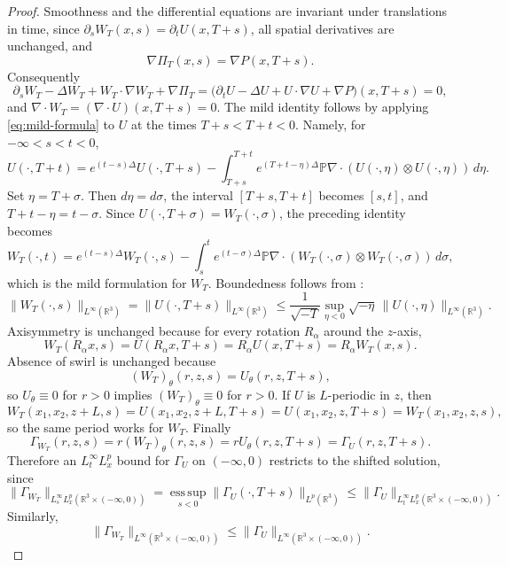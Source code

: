 \documentclass[11pt]{amsart}
\theoremstyle{plain}
\theoremstyle{definition}
\theoremstyle{remark}
\numberwithin{equation}{section}
\begin{document}
\begin{proof}
Smoothness and the differential equations are invariant under translations in
time, since \(\partial_s W_T(x,s)=\partial_tU(x,T+s)\), all spatial
derivatives are unchanged, and
\[
   \nabla\Pi_T(x,s)=\nabla P(x,T+s).
\]
Consequently
\[
   \partial_s W_T-\Delta W_T+W_T\cdot\nabla W_T+\nabla\Pi_T
   =
   \bigl(\partial_t U-\Delta U+U\cdot\nabla U+\nabla P\bigr)(x,T+s)
   =0,
\]
and \(\nabla\cdot W_T=(\nabla\cdot U)(x,T+s)=0\).  The mild identity follows
by applying \eqref{eq:mild-formula} to \(U\) at the times \(T+s<T+t<0\).
Namely, for
\(-\infty<s<t<0\),
\[
   U(\cdot,T+t)
   =
   e^{(t-s)\Delta}U(\cdot,T+s)
   -\int_{T+s}^{T+t}
      e^{(T+t-\eta)\Delta}\mathbb P\nabla\cdot
      (U(\cdot,\eta)\otimes U(\cdot,\eta))\,d\eta .
\]
Set \(\eta=T+\sigma\).  Then \(d\eta=d\sigma\), the interval
\([T+s,T+t]\) becomes \([s,t]\), and \(T+t-\eta=t-\sigma\).  Since
\(U(\cdot,T+\sigma)=W_T(\cdot,\sigma)\), the preceding identity becomes
\[
   W_T(\cdot,t)=e^{(t-s)\Delta}W_T(\cdot,s)
   -\int_s^t e^{(t-\sigma)\Delta}\mathbb P\nabla\cdot
      (W_T(\cdot,\sigma)\otimes W_T(\cdot,\sigma))\,d\sigma,
\]
which is the mild formulation for \(W_T\).
Boundedness follows from :
\[
   \|W_T(\cdot,s)\|_{L^\infty(\mathbb R^3)}
   =
   \|U(\cdot,T+s)\|_{L^\infty(\mathbb R^3)}
   \le
   \frac{1}{\sqrt{-T}}
   \sup_{\eta<0}\sqrt{-\eta}\,
      \|U(\cdot,\eta)\|_{L^\infty(\mathbb R^3)} .
\]
Axisymmetry is unchanged because for every rotation \(R_\alpha\) around the
\(z\)-axis,
\[
   W_T(R_\alpha x,s)=U(R_\alpha x,T+s)
   =R_\alpha U(x,T+s)=R_\alpha W_T(x,s).
\]
Absence of swirl is unchanged because
\[
   (W_T)_\theta(r,z,s)=U_\theta(r,z,T+s),
\]
so \(U_\theta\equiv0\) for \(r>0\) implies \((W_T)_\theta\equiv0\) for
\(r>0\).  If \(U\) is \(L\)-periodic in \(z\), then
\[
   W_T(x_1,x_2,z+L,s)
   =U(x_1,x_2,z+L,T+s)
   =U(x_1,x_2,z,T+s)
   =W_T(x_1,x_2,z,s),
\]
so the same period works for \(W_T\).  Finally
\[
   \Gamma_{W_T}(r,z,s)=r(W_T)_\theta(r,z,s)
   =rU_\theta(r,z,T+s)=\Gamma_U(r,z,T+s).
\]
Therefore an \(L_t^\infty L_x^p\) bound for \(\Gamma_U\) on
\((-\infty,0)\) restricts to the shifted solution, since
\[
   \|\Gamma_{W_T}\|_{L_s^\infty L_x^p(\mathbb R^3\times(-\infty,0))}
   =
   \operatorname*{ess\,sup}_{s<0}
      \|\Gamma_U(\cdot,T+s)\|_{L^p(\mathbb R^3)}
   \le
   \|\Gamma_U\|_{L_t^\infty L_x^p(\mathbb R^3\times(-\infty,0))}.
\]
Similarly,
\[
   \|\Gamma_{W_T}\|_{L^\infty(\mathbb R^3\times(-\infty,0))}
   \le
   \|\Gamma_U\|_{L^\infty(\mathbb R^3\times(-\infty,0))}.
\]
\end{proof}
\end{document}
